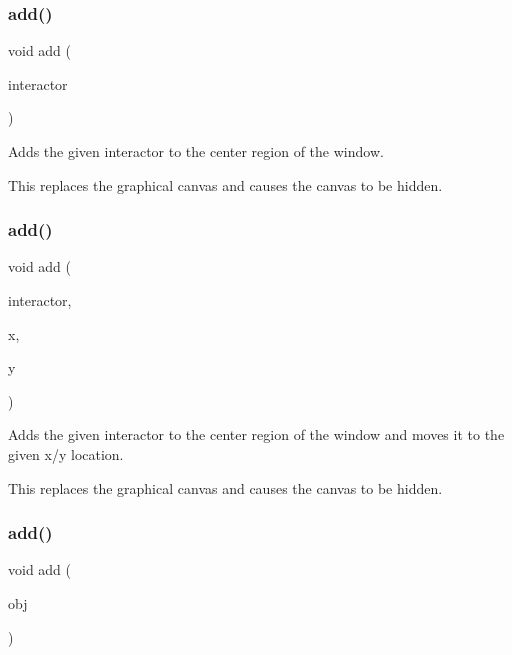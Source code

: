 \subsubsection{\texorpdfstring{add()}{add()}\hspace{0.1cm}{\footnotesize\ttfamily [3/8]}}
{\footnotesize\ttfamily void add (\begin{DoxyParamCaption}\item[{\mbox{\hyperlink{classGInteractor}{G\+Interactor}} \&}]{interactor }\end{DoxyParamCaption})\hspace{0.3cm}{\ttfamily [virtual]}}



Adds the given interactor to the center region of the window. 

This replaces the graphical canvas and causes the canvas to be hidden. \mbox{\label{classGWindow_a56840f453f9938083c24c7fb1a4c377e}} 
\subsubsection{\texorpdfstring{add()}{add()}\hspace{0.1cm}{\footnotesize\ttfamily [4/8]}}
{\footnotesize\ttfamily void add (\begin{DoxyParamCaption}\item[{\mbox{\hyperlink{classGInteractor}{G\+Interactor}} \&}]{interactor,  }\item[{double}]{x,  }\item[{double}]{y }\end{DoxyParamCaption})\hspace{0.3cm}{\ttfamily [virtual]}}



Adds the given interactor to the center region of the window and moves it to the given x/y location. 

This replaces the graphical canvas and causes the canvas to be hidden. \mbox{\label{classGWindow_a2327d64402837eedd533c098014e46d9}} 
\subsubsection{\texorpdfstring{add()}{add()}\hspace{0.1cm}{\footnotesize\ttfamily [5/8]}}
{\footnotesize\ttfamily void add (\begin{DoxyParamCaption}\item[{\mbox{\hyperlink{classGObject}{G\+Object}} $\ast$}]{obj }\end{DoxyParamCaption})\hspace{0.3cm}{\ttfamily [virtual]}}



